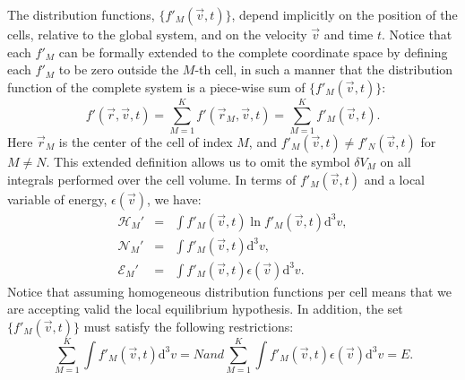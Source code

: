 The distribution functions, $\{f'_M(\vec{v},t)\}$, depend implicitly on the position of the cells,
relative to the global system, and on the velocity
$\vec{v}$ and time $t$. Notice that each $f'_M$ can be formally extended to the complete coordinate space
by defining each $f'_M$ to be zero outside the $M$-th cell, in such a manner that
the distribution function of the complete system is a piece-wise sum
of $\{f'_M(\vec v,t)\}$:
%
\begin{equation}
   f'(\vec r,\vec v,t)=\sum_{M=1}^Kf'(\vec r_M,\vec v,t)=\sum_{M=1}^Kf'_M(\vec v,t).
\end{equation}
%
Here $\vec r_M$ is the center of the cell of index $M$, and $f'_M(\vec v,t)\neq f'_N(\vec v,t)$
for $M\neq N$. This extended definition
allows us to omit the symbol $\delta V_M$ on all integrals performed over the cell volume.
In terms of $f'_M(\vec{v},t)$ and a local variable of energy, $\epsilon(\vec{v})$, we have:
%
\begin{subequations}\label{eq:cellrestrictions}
\begin{eqnarray}
    \mathcal{H}_M' & = &  \int f'_M(\vec{v},t) \ln f'_{M}(\vec{v},t)
      \mathrm{d}^{3}v \label{eq:Hcell},\\
    \mathcal{N}_M' & = & \int f'_{M}(\vec{v} ,t) \mathrm{d}^{3}v,\label{eq:Ncell}\\
    \mathcal{E}_M' & = & \int f'_{M}(\vec{v},t)\epsilon(\vec{v}) \mathrm{d}^{3}v\label{eq:Ecell}.
\end{eqnarray}
\end{subequations}
%
Notice that assuming homogeneous distribution functions per cell means that we are accepting valid the 
local equilibrium hypothesis. In addition, the set $\{f'_{M}(\vec{v},t)\}$ must satisfy the following restrictions:
%
\begin{subequations}\label{eq:micro}
\begin{equation}\label{eq:micron}
    \sum_{M=1}^{K}\int f'_M(\vec{v},t)\mathrm{d}^3v =N
\end{equation}
and
\begin{equation}\label{eq:microe}
    \sum_{M=1}^{K}\int f'_M(\vec{v},t)\epsilon(\vec{v})\mathrm{d}^3v=E.
\end{equation}
\end{subequations}
%

